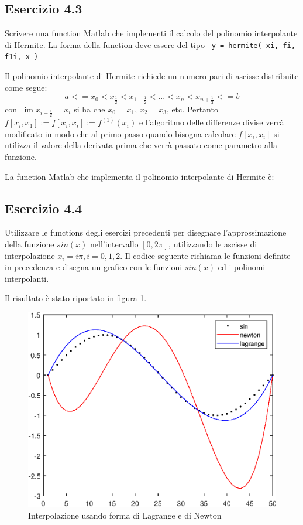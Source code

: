 	\subsection {Esercizio 4.3}
Scrivere una function Matlab che implementi il calcolo del polinomio interpolante di Hermite. La forma della function deve essere del tipo \texttt{ y = hermite( xi, fi, f1i, x ) }

Il polinomio interpolante di Hermite richiede un numero pari di ascisse distribuite come segue: 
\begin{equation}
	a <= x_0 < x_{\frac{1}{2}} < x_{1+\frac{1}{2}} < ... < x_n < x_{n+\frac{1}{2}} <= b
\end{equation}
con $\lim{x_{i+\frac{1}{2}} = x_i}$ si ha che $x_0 = x_1$, $x_2=x_3$, etc. Pertanto $f[x_i, x_1]:=f[x_i, x_i]:=f^{(1)}(x_i)$ e l'algoritmo delle differenze divise verrà modificato in modo che al primo passo quando bisogna calcolare $f[x_i, x_i]$ si utilizza il valore della derivata prima che verrà passato come parametro alla funzione.

La function Matlab che implementa il polinomio interpolante di Hermite è:



	\pagebreak
	\subsection {Esercizio 4.4}
Utilizzare le functions degli esercizi precedenti per disegnare l'approssimazione della funzione $sin(x)$  nell'intervallo $[0, 2\pi]$, utilizzando le ascisse di interpolazione $x_{i}=i\pi, i=0,1,2$.
\pp
Il codice seguente richiama le funzioni definite in precedenza e disegna un grafico con le funzioni $sin(x)$ ed i polinomi interpolanti.

Il risultato è stato riportato in figura \ref{sin_interpolation}.

\begin{figure}[h]\label{sin_interpolation}
    \centering
    \includegraphics[scale=0.8]{./capitolo_4/sin_interpolation}
    \caption{Interpolazione usando forma di Lagrange e di Newton}
\end{figure} 



